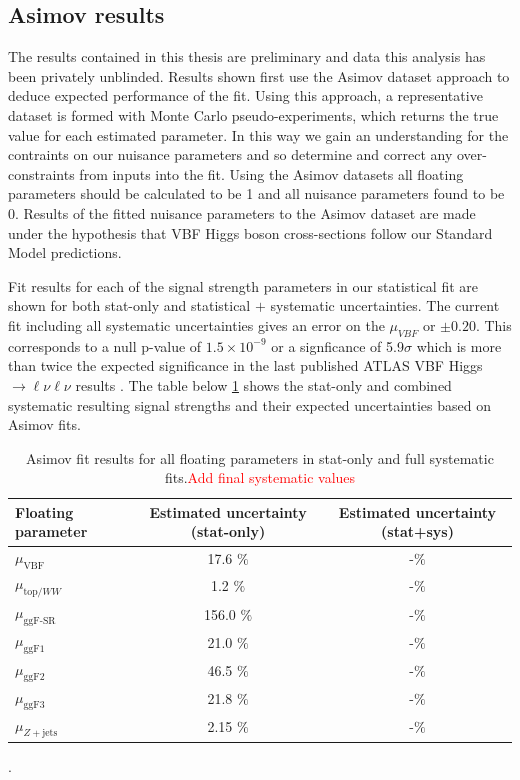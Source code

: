 \subsection{Asimov results}
The results contained in this thesis are preliminary and data this analysis has been privately unblinded. Results shown first use the Asimov dataset approach to deduce expected performance of the fit. Using this approach, a representative dataset is formed with Monte Carlo pseudo-experiments, which returns the true value for each estimated parameter. In this way we gain an understanding for the contraints on our nuisance parameters and so determine and correct any over-constraints from inputs into the fit. Using the Asimov datasets all floating parameters should be calculated to be 1 and all nuisance parameters found to be 0. Results of the fitted nuisance parameters to the Asimov dataset are made under the hypothesis that VBF Higgs boson cross-sections follow our Standard Model predictions. 


Fit results for each of the signal strength parameters in our statistical fit are shown for both stat-only and statistical $+$ systematic uncertainties. The current fit including all systematic uncertainties gives an error on the $\mu_{VBF}$ or $\pm 0.20$. This corresponds to a null p-value of $1.5\times10^{-9}$ or a signficance of 5.9$\sigma$ which is more than twice the expected significance in the last published ATLAS VBF Higgs $\rightarrow \ell\nu\ell\nu$ results \cite{Aaboud_2019}. The table below \ref{tab:muresults} shows the stat-only and combined systematic resulting signal strengths and their expected uncertainties based on Asimov fits. 

\begin{table}[!h]
  \begin{center}
    \begin{tabular}{l|c|c|}
       Floating parameter & Estimated uncertainty (stat-only)    & Estimated uncertainty (stat+sys) \\
      \hline
       $\mu_{\text{VBF}}$ & 17.6 $\%$ & -$\%$ \\
       $\mu_{\text{top/}WW}$ & 1.2 $\%$ & -$\%$\\
       $\mu_{\text{ggF-SR}}$ & 156.0 $\%$ & -$\%$ \\
       $\mu_{\text{ggF1}}$ & 21.0 $\%$ & -$\%$ \\
       $\mu_{\text{ggF2}}$ & 46.5 $\%$ & -$\%$ \\
       $\mu_{\text{ggF3}}$ & 21.8 $\%$ & -$\%$ \\
       $\mu_{Z+\text{jets}}$ & 2.15 $\%$ & -$\%$ \\
    \end{tabular}
    \caption{Asimov fit results for all floating parameters in stat-only and full systematic fits.\textcolor{red}{Add final systematic values}}.
    \label{tab:muresults}
  \end{center}
\end{table}

